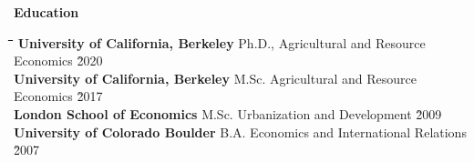 \documentclass[10pt, oneside]{article}
\newcommand\mytabs{\hspace*{1cm}\=\hspace{1cm}\=\hspace{1cm}\=\hspace{1cm}\=\hspace{1cm}\=\hspace{1cm}\=\hspace{1cm}\=\hspace{1cm}\=\hspace{1cm}\=\hspace{1cm}}
\newenvironment{mysec}[1][\mytabs]
  {\begin{tabbing}#1\kill\ignorespaces}
  {\end{tabbing}}
\begin{document}
\begin{minipage}[t]{0.1\linewidth}
\textbf{Education}
\end{minipage}\hspace{0.05\linewidth}
\begin{minipage}[t]{0.8\linewidth}
\begin{mysec} 
\textbf{University of California, Berkeley} \>\>\>\>\>\> Ph.D., Agricultural and Resource Economics \`2020\\
\textbf{University of California, Berkeley} \>\>\>\>\> \>M.Sc. Agricultural and Resource Economics \`2017\\
\textbf{London School of Economics} \>\>\>\>\> \>M.Sc. Urbanization and Development \`2009\\
\textbf{University of Colorado Boulder} \>\>\>\>\>\> B.A. Economics and International Relations \`2007
\end{mysec}
\end{minipage}\vspace{3mm}
\end{document}
